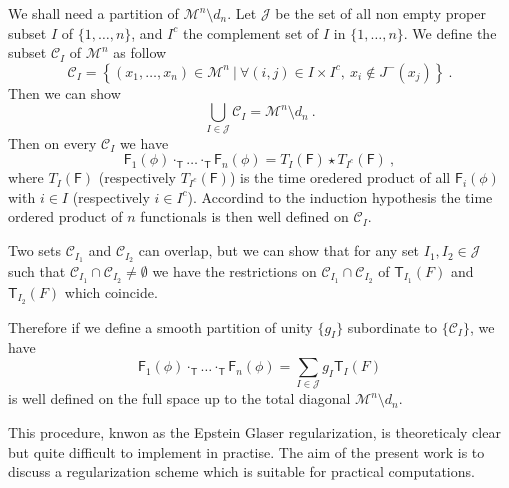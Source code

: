 \documentclass[12pt]{book}
\newcommand{\Ccal}{\mathcal{C}}
\newcommand{\Jcal}{\mathcal{J}}
\newcommand{\Mcal}{\mathcal{M}}
\newcommand{\Fsf}{\mathsf{F}}
\newcommand{\Tsf}{\mathsf{T}}
\theoremstyle{break}
\begin{document}

We shall need a partition of $\Mcal^n \setminus d_n$. Let $\Jcal$ be the set of all non empty proper subset $I$ of $\{1,\dots,n\}$, and $I^c$ the complement set of $I$ in $\{1,\dots,n\}$. We define the subset $\Ccal_I$ of $\Mcal^n$ as follow
%
\begin{equation*}
\Ccal_I = \left\{ (x_1,\dots,x_n) \in \Mcal^n \ | \ \forall (i,j) \in I \times I^c , \ x_i \notin J^-(x_j) \right\} \ .
\end{equation*}
%
Then we can show \cite{brunetti_microlocal_2000}
%
\begin{equation*}
\bigcup_{I \in \Jcal} \Ccal_I = \Mcal^n \setminus d_n \ .
\end{equation*}
%
Then on every $\Ccal_I$ we have 
%
\begin{equation*}
\Fsf_1(\phi) \cdot_\Tsf \dots \cdot_\Tsf \Fsf_n(\phi) = T_I(\Fsf) \star T_{I^c}(\Fsf) \ , 
\end{equation*}
%
where $T_I(\Fsf)$ (respectively $T_{I^c}(\Fsf)$) is the time oredered product of all $\Fsf_i(\phi)$ with $i \in I$ (respectively $i \in I^c$). Accordind to the induction hypothesis the time ordered product of $n$ functionals is then well defined on $\Ccal_I$. 




Two sets $\Ccal_{I_1}$ and $\Ccal_{I_2}$ can overlap, but we can show \cite{brunetti_microlocal_2000} that for any set $I_1 , I_2 \in \Jcal$ such that $\Ccal_{I_1} \cap \Ccal_{I_2} \neq \emptyset$ we have the restrictions on $\Ccal_{I_1} \cap \Ccal_{I_2}$ of $\Tsf_{I_1}(F)$ and $\Tsf_{I_2}(F)$ which coincide. 




Therefore if we define a smooth partition of unity $\{ g_I\}$  subordinate to $\{\Ccal_I\}$, we have
%
\begin{equation*}
\Fsf_1(\phi) \cdot_\Tsf \dots \cdot_\Tsf \Fsf_n(\phi) = \sum_{I\in\Jcal} g_I \Tsf_I(F) 
\end{equation*}
%
is well defined on the full space up to the total diagonal $\Mcal^n \setminus d_n$. 





This procedure, knwon as the Epstein Glaser regularization, is theoreticaly clear but quite difficult to implement in practise. The aim of the present work is to discuss a regularization scheme which is suitable for practical computations.


\end{document}
